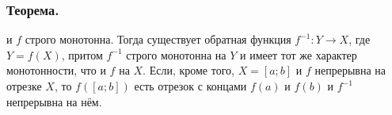 \subsubsection{Теорема.}
\fXR и $f$ строго монотонна.
Тогда существует обратная функция $f^{-1}:Y \to X$, где $Y=f(X)$, притом $f^{-1}$ строго монотонна на $Y$ и имеет тот же характер монотонности, что и $f$ на $X$.
Если, кроме того, $X=[a;b]$ и $f$ непрерывна на отрезке $X$, то $f([a; b])$ есть отрезок с концами $f(a)$ и $f(b)$ и $f^{-1}$ непрерывна на нём.

